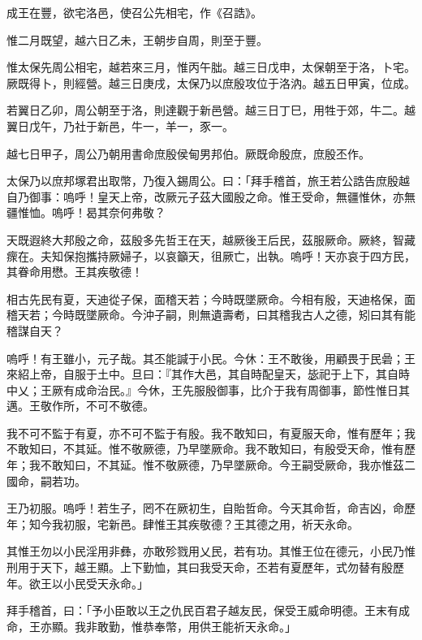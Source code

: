 
\begin{pinyinscope}
成王在豐，欲宅洛邑，使召公先相宅，作《召誥》。

惟二月既望，越六日乙未，王朝步自周，則至于豐。

惟太保先周公相宅，越若來三月，惟丙午朏。越三日戊申，太保朝至于洛，卜宅。厥既得卜，則經營。越三日庚戌，太保乃以庶殷攻位于洛汭。越五日甲寅，位成。

若翼日乙卯，周公朝至于洛，則達觀于新邑營。越三日丁巳，用牲于郊，牛二。越翼日戊午，乃社于新邑，牛一，羊一，豕一。

越七日甲子，周公乃朝用書命庶殷侯甸男邦伯。厥既命殷庶，庶殷丕作。

太保乃以庶邦塚君出取幣，乃復入錫周公。曰：「拜手稽首，旅王若公誥告庶殷越自乃御事：嗚呼！皇天上帝，改厥元子茲大國殷之命。惟王受命，無疆惟休，亦無疆惟恤。嗚呼！曷其奈何弗敬？

天既遐終大邦殷之命，茲殷多先哲王在天，越厥後王后民，茲服厥命。厥終，智藏瘝在。夫知保抱攜持厥婦子，以哀籲天，徂厥亡，出執。嗚呼！天亦哀于四方民，其眷命用懋。王其疾敬德！

相古先民有夏，天迪從子保，面稽天若；今時既墜厥命。今相有殷，天迪格保，面稽天若；今時既墜厥命。今沖子嗣，則無遺壽耇，曰其稽我古人之德，矧曰其有能稽謀自天？

嗚呼！有王雖小，元子哉。其丕能諴于小民。今休：王不敢後，用顧畏于民碞；王來紹上帝，自服于土中。旦曰：『其作大邑，其自時配皇天，毖祀于上下，其自時中乂；王厥有成命治民。』今休，王先服殷御事，比介于我有周御事，節性惟日其邁。王敬作所，不可不敬德。

我不可不監于有夏，亦不可不監于有殷。我不敢知曰，有夏服天命，惟有歷年；我不敢知曰，不其延。惟不敬厥德，乃早墜厥命。我不敢知曰，有殷受天命，惟有歷年；我不敢知曰，不其延。惟不敬厥德，乃早墜厥命。今王嗣受厥命，我亦惟茲二國命，嗣若功。

王乃初服。嗚呼！若生子，罔不在厥初生，自貽哲命。今天其命哲，命吉凶，命歷年；知今我初服，宅新邑。肆惟王其疾敬德？王其德之用，祈天永命。

其惟王勿以小民淫用非彝，亦敢殄戮用乂民，若有功。其惟王位在德元，小民乃惟刑用于天下，越王顯。上下勤恤，其曰我受天命，丕若有夏歷年，式勿替有殷歷年。欲王以小民受天永命。」

拜手稽首，曰：「予小臣敢以王之仇民百君子越友民，保受王威命明德。王末有成命，王亦顯。我非敢勤，惟恭奉幣，用供王能祈天永命。」


\end{pinyinscope}